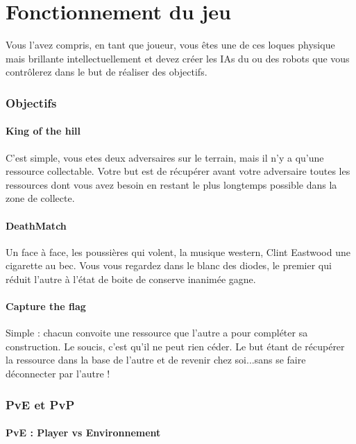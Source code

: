\documentclass[10pt]{article}
\begin{document}
\newpage
\setcounter{section}{0}
\part{Fonctionnement du jeu}

Vous l'avez compris, en tant que joueur, vous êtes une de ces loques physique mais brillante intellectuellement et devez créer les IAs du ou des robots que vous contrôlerez dans le but de réaliser des objectifs.

\section{Objectifs}
\subsection{King of the hill}

C'est simple, vous etes deux adversaires sur le terrain, mais il n'y a qu'une ressource collectable. Votre but est de récupérer avant votre adversaire toutes les ressources dont vous avez besoin en restant le plus longtemps possible dans la zone de collecte.

\subsection{DeathMatch}

Un face à face, les poussières qui volent, la musique western, Clint Eastwood une cigarette au bec. Vous vous regardez dans le blanc des diodes, le premier qui réduit l'autre à l'état de boite de conserve inanimée gagne.

\subsection{Capture the flag}

Simple : chacun convoite une ressource que l'autre a pour compléter sa construction. Le soucis, c'est qu'il ne peut rien céder. Le but étant de récupérer la ressource dans la base de l'autre et de revenir chez soi...sans se faire déconnecter par l'autre !

\section{PvE et PvP}
\subsection{PvE : Player vs Environnement}
\end{document}
